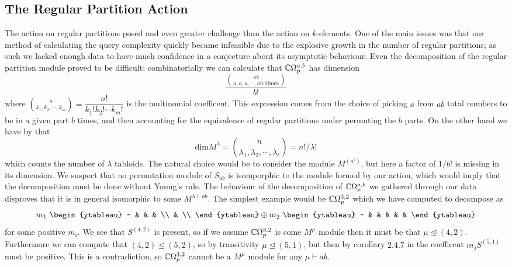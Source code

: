 \documentclass[12pt,twoside]{reedthesis}
\theoremstyle{plain}   %
\theoremstyle{definition}
\theoremstyle{remark}
\numberwithin{equation}{section}
\def\dim{\mathrm{dim}}
\def\normeq{\trianglelefteq}
\begin{document}
\subsection{The Regular Partition Action}
The action on regular partitions posed and even greater challenge than the action on $k$-elements.
One of the main issues was that our method of calculating the query complexity quickly became infeasible due to the explosive growth in the number of regular partitions;
as such we lacked enough data to have much confidence in a conjecture about its asymptotic behaviour.
Even the decomposition of the regular partition module proved to be difficult; combinatorially we can calculate that $\mathbb{C} \Omega_p^{a,b}$ has dimension
\[ \dfrac{\binom{ab}{a,a,a,\cdots,a \text{b times}}}{b!}\]
where $\binom{n}{k_1,k_2,\cdots,k_m} = \dfrac{n!}{k_1! k_2! \cdots k_m!}$ is the multinomial coefficent.
This expression comes from the choice of picking $a$ from $ab$ total numbers to be in a given part $b$ times, and then accounting for the equivalence of regular partitions under permuting the $b$ parts.
On the other hand we have by \cite[Proposition 2.1.11]{sagan} that
\[ \dim M^\lambda = \binom{n}{\lambda_1, \lambda_2, \cdots, \lambda_\ell} =   n! /\lambda!\]
which counts the number of $\lambda$ tabloids.
The natural choice would be to consider the module $M^{(a^b)}$, but here a factor of $1/b!$ is missing in its dimension.
We suspect that no permutation module of $S_{ab}$ is isomporphic to the module formed by our action, which would imply that the decomposition must be done without Young's rule.
The behaviour of the decomposition of $\mathbb{C} \Omega_p^{a,b}$ we gathered through our data disproves that it is in general isomorphic to some $M^{\lambda \vdash ab}$.
The simplest example would be $\mathbb{C} \Omega_p^{3,2}$ which we have computed to decompose as
\[
  m_1 \
  \begin{ytableau}
    ~ & & &  \\
    & \\
  \end{ytableau}
  \oplus
  m_2 \
  \begin{ytableau}
    ~ & & & & &
  \end{ytableau}
\]
for some positive $m_i$. We see that $S^{(4,2)}$ is present, so if we assume $\mathbb{C} \Omega_p^{3,2}$ is some $M^\mu$ module then it must be that $ \mu \normeq (4,2)$.
Furthermore we can compute that $(4,2) \normeq (5,2)$, so by transitivity $\mu \normeq (5,1)$, but then by corollary $2.4.7$ in \cite{sagan} the coefficent $m_j S^{(5,1)}$ must be positive.
This is a contradiction, so $\mathbb{C} \Omega_p^{3,2}$ cannot be a $M^\mu$ module for any $\mu \vdash ab$.
\end{document}
